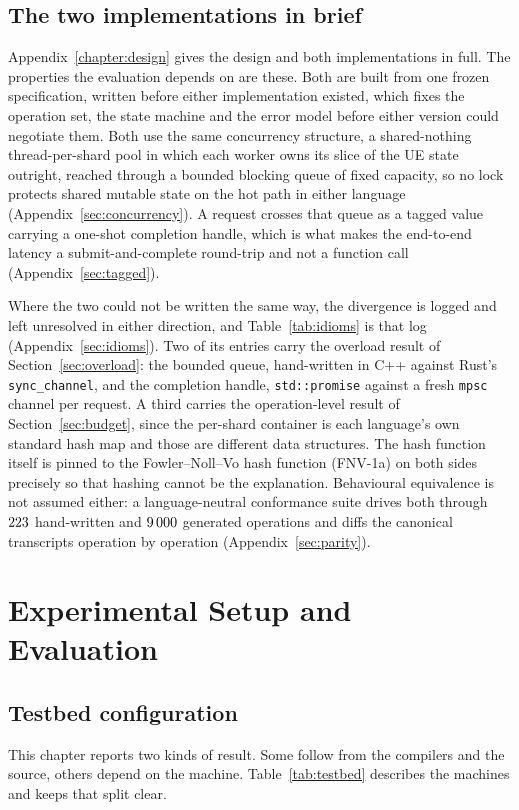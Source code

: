 \documentclass[english,oneside,a4paper,censored,csm,software-track-2020]{HYthesisML}
\begin{document}
\section{The two implementations in brief}\label{sec:designbrief}
Appendix~\ref{chapter:design} gives the design and both implementations in full. The properties
the evaluation depends on are these. Both are built from one frozen specification, written before
either implementation existed, which fixes the operation set, the state machine and the error
model before either version could negotiate them. Both use the same
concurrency structure, a shared-nothing thread-per-shard pool in which each worker owns its slice
of the UE state outright, reached through a bounded blocking queue of fixed capacity, so no lock
protects shared mutable state on the hot path in either language
(Appendix~\ref{sec:concurrency}). A request crosses that queue as a tagged value carrying a
one-shot completion handle, which is what makes the end-to-end latency a submit-and-complete
round-trip and not a function call (Appendix~\ref{sec:tagged}).

Where the two could not be written the same way, the divergence is logged and left unresolved in
either direction, and Table~\ref{tab:idioms} is that log
(Appendix~\ref{sec:idioms}). Two of its entries carry the overload result of
Section~\ref{sec:overload}: the bounded queue, hand-written in C++ against Rust's
\texttt{sync\_channel}, and the completion handle, \texttt{std::promise} against a fresh
\texttt{mpsc} channel per request. A third carries the operation-level result of
Section~\ref{sec:budget}, since the per-shard container is each language's own standard hash map
and those are different data structures. The hash function itself is pinned to the
Fowler--Noll--Vo hash function (FNV-1a) on both
sides precisely so that hashing cannot be the explanation. Behavioural equivalence is not assumed
either: a language-neutral conformance suite drives both through $223$ hand-written and
$9\,000$ generated operations and diffs the canonical transcripts operation by operation
(Appendix~\ref{sec:parity}).

\chapter{Experimental Setup and Evaluation\label{chapter:eval}}

\section{Testbed configuration\label{sec:testbed}}
This chapter reports two kinds of result. Some follow from the compilers and the source, others
depend on the machine. Table~\ref{tab:testbed} describes the machines and keeps that split clear.
\end{document}
